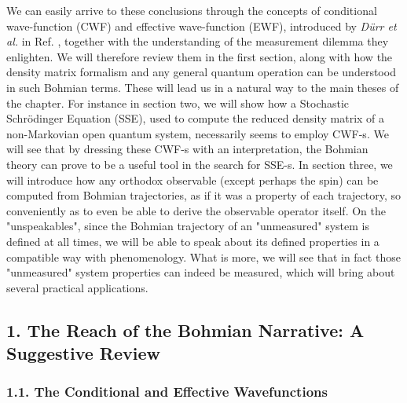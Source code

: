 \documentclass[11pt, a4paper]{article} %
\begin{document}
We can easily arrive to these conclusions through the concepts of conditional wave-function (CWF) and effective wave-function (EWF), introduced by {\em Dürr et al.} in Ref. \cite{Absolute}, together with the understanding of the measurement dilemma they enlighten. We will therefore review them in the first section, along with how the density matrix formalism and any general quantum operation can be understood in such Bohmian terms. These will lead us in a natural way to the main theses of the chapter. For instance in section two, we will show how a Stochastic Schrödinger Equation (SSE), used to compute the reduced density matrix of a non-Markovian open quantum system, necessarily seems to employ CWF-s. We will see that by dressing these CWF-s with an interpretation, the Bohmian theory can prove to be a useful tool in the search for SSE-s. In section three, we will introduce how any orthodox observable (except perhaps the spin) can be computed from Bohmian trajectories, as if it was a property of each trajectory, so conveniently as to even be able to derive the observable operator itself. On the "unspeakables", since the Bohmian trajectory of an "unmeasured" system is defined at all times, we will be able to speak about its defined properties in a compatible way with phenomenology. What is more, we will see that in fact those "unmeasured" system properties can indeed be measured, which will bring about several practical applications.



\subsection*{1. The Reach of the Bohmian Narrative: A Suggestive Review}
\vspace{-0.2cm}

\subsubsection*{1.1. The Conditional and Effective Wavefunctions}
\vspace{-0.2cm}
\end{document}
